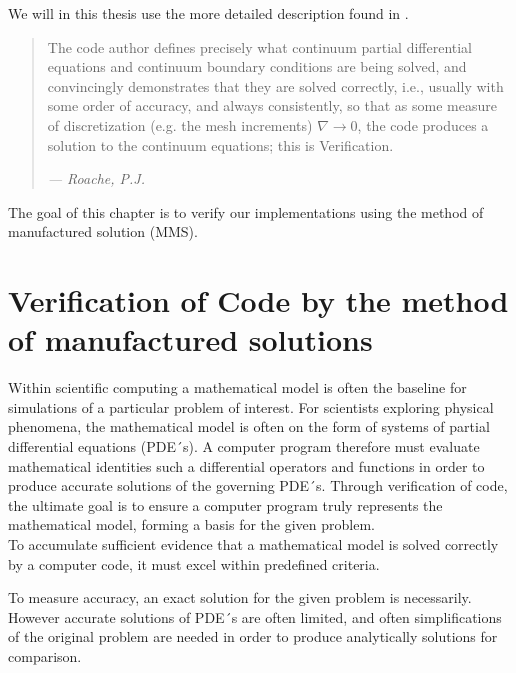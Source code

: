 
We will in this thesis use the more detailed  description found in \cite{Roache}.

\begin{quote}
The code author defines precisely what continuum partial differential equations and continuum boundary conditions are being solved, and convincingly demonstrates that they are solved correctly, i.e., usually with some order of accuracy, and always consistently, so that as some measure of discretization (e.g. the mesh increments) $\nabla \rightarrow 0$, the code produces a solution to the continuum equations; this is Verification.
\begin{flushright}
\textit{--- Roache, P.J.}
\end{flushright}
\end{quote}
 


The goal of this chapter is to verify our implementations using the method of manufactured solution  (MMS).

\section{Verification of Code by the method of manufactured solutions}
Within scientific computing a mathematical model is often the baseline for simulations of a particular problem of interest. For scientists exploring physical phenomena, the mathematical model is often on the form of systems of partial differential equations (PDE´s). A computer program therefore must evaluate  mathematical identities such a differential operators and functions in order to produce accurate solutions of the governing PDE´s. 
Through verification of code, the ultimate goal is to ensure a computer program truly represents the mathematical model, forming a basis for the given problem. \\
To accumulate sufficient evidence that a mathematical model is solved correctly by a computer code,  it must excel within predefined criteria. 




To measure accuracy, an exact solution for the given problem is necessarily. However accurate solutions of PDE´s are often limited, and often simplifications of the original problem are needed in order to produce analytically solutions for comparison. 

